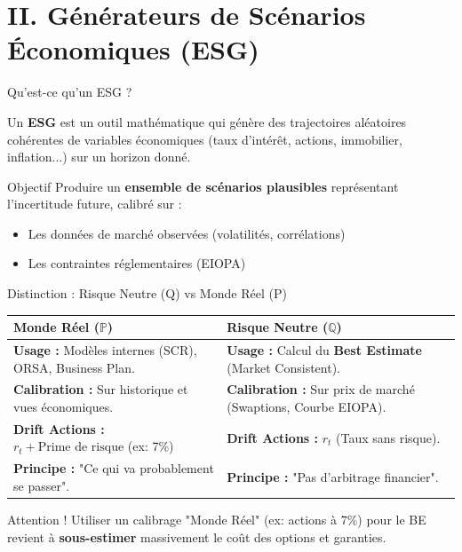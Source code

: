 \documentclass[10pt,aspectratio=169,xcolor={dvipsnames}]{beamer}
\begin{document}
\section{II. Générateurs de Scénarios Économiques (ESG)}

\begin{frame}{Qu'est-ce qu'un ESG ?}
\begin{definition}
Un \textbf{ESG} est un outil mathématique qui génère des trajectoires aléatoires cohérentes de variables économiques (taux d'intérêt, actions, immobilier, inflation...) sur un horizon donné.
\end{definition}

\vspace{0.3cm}
\begin{block}{Objectif}
Produire un \textbf{ensemble de scénarios plausibles} représentant l'incertitude future, calibré sur :
\begin{itemize}
    \item Les données de marché observées (volatilités, corrélations)
    \item Les contraintes réglementaires (EIOPA)
\end{itemize}
\end{block}
\end{frame}

\begin{frame}{Distinction : Risque Neutre (Q) vs Monde Réel (P)}
\begin{table}
\centering
\small
\renewcommand{\arraystretch}{1.5}
\begin{tabular}{p{5.5cm}|p{5.5cm}}
\toprule
\cellcolor{blue!10} \textbf{Monde Réel ($\mathbb{P}$)} & \cellcolor{green!10} \textbf{Risque Neutre ($\mathbb{Q}$)} \\
\midrule
\textbf{Usage :} Modèles internes (SCR), ORSA, Business Plan. & \textbf{Usage :} Calcul du \textbf{Best Estimate} (Market Consistent). \\
\midrule
\textbf{Calibration :} Sur historique et vues économiques. & \textbf{Calibration :} Sur prix de marché (Swaptions, Courbe EIOPA). \\
\midrule
\textbf{Drift Actions :} $r_t + \text{Prime de risque}$ (ex: 7\%) & \textbf{Drift Actions :} $r_t$ (Taux sans risque). \\
\midrule
\textbf{Principe :} "Ce qui va probablement se passer". & \textbf{Principe :} "Pas d'arbitrage financier". \\
\bottomrule
\end{tabular}
\end{table}

\begin{alertblock}{Attention !}
Utiliser un calibrage "Monde Réel" (ex: actions à 7\%) pour le BE revient à \textbf{sous-estimer} massivement le coût des options et garanties.
\end{alertblock}
\end{frame}
\end{document}
